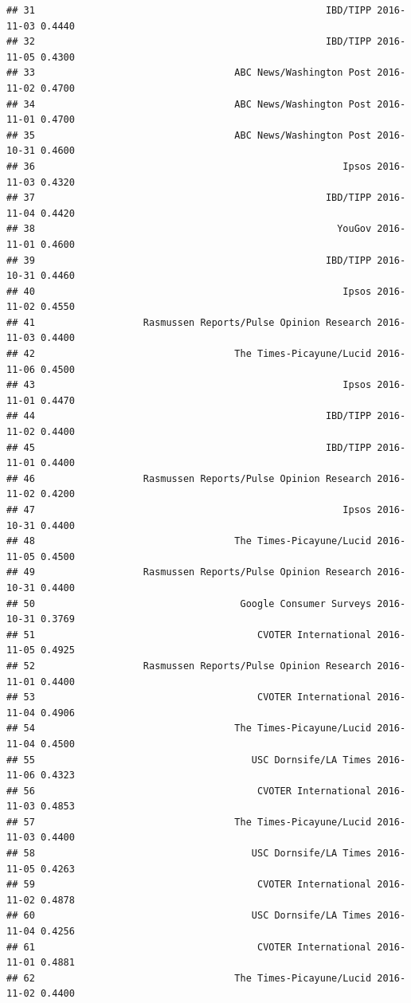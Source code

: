 \documentclass[
]{article}
\begin{document}
\begin{verbatim}
## 31                                                   IBD/TIPP 2016-11-03 0.4440
## 32                                                   IBD/TIPP 2016-11-05 0.4300
## 33                                   ABC News/Washington Post 2016-11-02 0.4700
## 34                                   ABC News/Washington Post 2016-11-01 0.4700
## 35                                   ABC News/Washington Post 2016-10-31 0.4600
## 36                                                      Ipsos 2016-11-03 0.4320
## 37                                                   IBD/TIPP 2016-11-04 0.4420
## 38                                                     YouGov 2016-11-01 0.4600
## 39                                                   IBD/TIPP 2016-10-31 0.4460
## 40                                                      Ipsos 2016-11-02 0.4550
## 41                   Rasmussen Reports/Pulse Opinion Research 2016-11-03 0.4400
## 42                                   The Times-Picayune/Lucid 2016-11-06 0.4500
## 43                                                      Ipsos 2016-11-01 0.4470
## 44                                                   IBD/TIPP 2016-11-02 0.4400
## 45                                                   IBD/TIPP 2016-11-01 0.4400
## 46                   Rasmussen Reports/Pulse Opinion Research 2016-11-02 0.4200
## 47                                                      Ipsos 2016-10-31 0.4400
## 48                                   The Times-Picayune/Lucid 2016-11-05 0.4500
## 49                   Rasmussen Reports/Pulse Opinion Research 2016-10-31 0.4400
## 50                                    Google Consumer Surveys 2016-10-31 0.3769
## 51                                       CVOTER International 2016-11-05 0.4925
## 52                   Rasmussen Reports/Pulse Opinion Research 2016-11-01 0.4400
## 53                                       CVOTER International 2016-11-04 0.4906
## 54                                   The Times-Picayune/Lucid 2016-11-04 0.4500
## 55                                      USC Dornsife/LA Times 2016-11-06 0.4323
## 56                                       CVOTER International 2016-11-03 0.4853
## 57                                   The Times-Picayune/Lucid 2016-11-03 0.4400
## 58                                      USC Dornsife/LA Times 2016-11-05 0.4263
## 59                                       CVOTER International 2016-11-02 0.4878
## 60                                      USC Dornsife/LA Times 2016-11-04 0.4256
## 61                                       CVOTER International 2016-11-01 0.4881
## 62                                   The Times-Picayune/Lucid 2016-11-02 0.4400

\end{verbatim}
\end{document}
